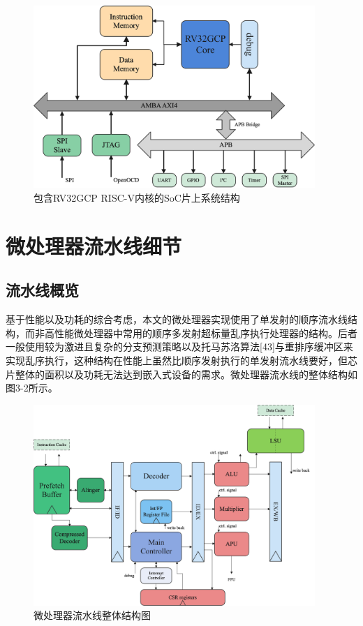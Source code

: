 \begin{figure}[htbp]
	\centering
	\includegraphics[width=0.95\textwidth]{Photos/SoC_Overview.png}
	\caption{包含RV32GCP RISC-V内核的SoC片上系统结构}
\end{figure}

\section{微处理器流水线细节}
\subsection{流水线概览}

基于性能以及功耗的综合考虑，本文的微处理器实现使用了单发射的顺序流水线结构，而非高性能微处理器中常用的顺序多发射超标量乱序执行处理器的结构。后者一般使用较为激进且复杂的分支预测策略以及托马苏洛算法[43]与重排序缓冲区来实现乱序执行，这种结构在性能上虽然比顺序发射执行的单发射流水线要好，但芯片整体的面积以及功耗无法达到嵌入式设备的需求。微处理器流水线的整体结构如图3-2所示。

\begin{figure}[htbp]
	\centering
	\includegraphics[width=0.95\textwidth]{Photos/Pipeline.png}
	\caption{微处理器流水线整体结构图}
\end{figure}

